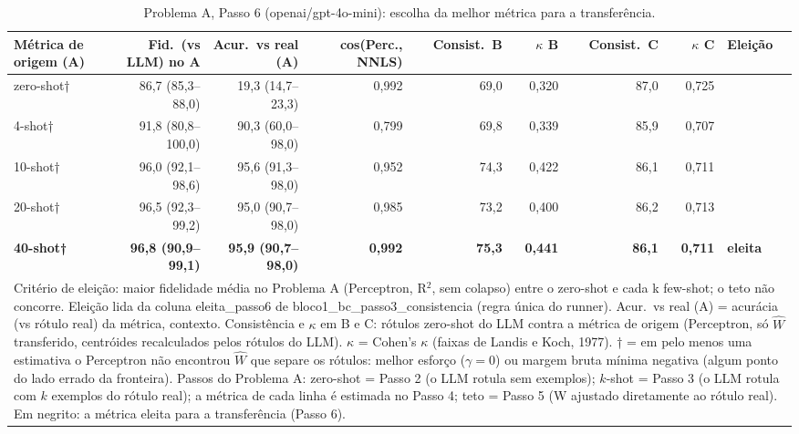 \begin{table}[htbp]
\centering
\small
\caption{Problema A, Passo 6 (openai/gpt-4o-mini): escolha da melhor métrica para a transferência.}
\label{tab:A_passo6_eleicao_gpt4mini}
\begin{tabular}{lrrrrrrrl}
\toprule
Métrica de origem (A) & Fid.\ (vs LLM) no A & Acur.\ vs real (A) & cos(Perc., NNLS) & Consist.\ B & $\kappa$ B & Consist.\ C & $\kappa$ C & Eleição \\
\midrule
zero-shot† & 86,7 (85,3–88,0) & 19,3 (14,7–23,3) & 0,992 & 69,0 & 0,320 & 87,0 & 0,725 &  \\
4-shot† & 91,8 (80,8–100,0) & 90,3 (60,0–98,0) & 0,799 & 69,8 & 0,339 & 85,9 & 0,707 &  \\
10-shot† & 96,0 (92,1–98,6) & 95,6 (91,3–98,0) & 0,952 & 74,3 & 0,422 & 86,1 & 0,711 &  \\
20-shot† & 96,5 (92,3–99,2) & 95,0 (90,7–98,0) & 0,985 & 73,2 & 0,400 & 86,2 & 0,713 &  \\
\textbf{40-shot†} & \textbf{96,8 (90,9–99,1)} & \textbf{95,9 (90,7–98,0)} & \textbf{0,992} & \textbf{75,3} & \textbf{0,441} & \textbf{86,1} & \textbf{0,711} & \textbf{eleita} \\
\bottomrule
\multicolumn{9}{p{0.95\linewidth}}{\footnotesize Critério de eleição: maior fidelidade média no Problema A (Perceptron, R$^2$, sem colapso) entre o zero-shot e cada k few-shot; o teto não concorre. Eleição lida da coluna eleita\_passo6 de bloco1\_bc\_passo3\_consistencia (regra única do runner). Acur.\ vs real (A) = acurácia (vs rótulo real) da métrica, contexto. Consistência e $\kappa$ em B e C: rótulos zero-shot do LLM contra a métrica de origem (Perceptron, só $\hat{W}$ transferido, centróides recalculados pelos rótulos do LLM). $\kappa$ = Cohen's $\kappa$ (faixas de Landis e Koch, 1977). † = em pelo menos uma estimativa o Perceptron não encontrou $\hat{W}$ que separe os rótulos: melhor esforço ($\gamma = 0$) ou margem bruta mínima negativa (algum ponto do lado errado da fronteira). Passos do Problema A: zero-shot = Passo 2 (o LLM rotula sem exemplos); $k$-shot = Passo 3 (o LLM rotula com $k$ exemplos do rótulo real); a métrica de cada linha é estimada no Passo 4; teto = Passo 5 (W ajustado diretamente ao rótulo real). Em negrito: a métrica eleita para a transferência (Passo 6).} \\
\end{tabular}
\end{table}

